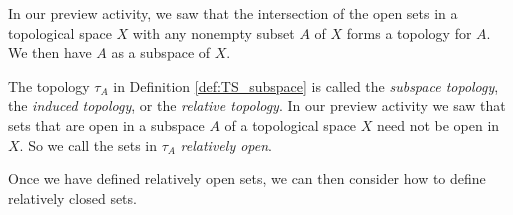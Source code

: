 \begin{comment}
	\item  Recall that the nonempty open sets in $\Z$ are those sets whose complements are finite. Note that the $\Z \setminus \{5\}$ is in $\tau_{FC}$. So if $n \in A$, then $(\Z \setminus \{5\}) \cap \{n\} = \{n\}$. So every subset of $A$ is open and $\tau_{A}$ is the discrete topology. The same argument shows that if $A$ is any finite subset of $\Z$, then the induced topology is the discrete topology. 

\item  Let $\E$ be the set of even integers. We claim that the induced topology is again the finite complement topology. Let $U$ be a subset of $\E$ with $\E \setminus U$ a finite subset of $\E$. Let $O$ be the union of $U$ with the set of odd integers. That is, $O = U \cup (\Z \setminus \E)$. Then $\Z \setminus O = \E \setminus U$ is finite and $O$ is in $\tau_{FC}$. Since $U = \E \cap O$, we have that $U$ is in the subspace topology. Conversely, if $O \in \tau_{FC}$, then $\Z \setminus O$ is finite. Since $\E \subset \Z$, we have $(\E \setminus O) \subseteq (\Z \setminus O)$ and 
\[\E \setminus (\E \cap O) = \E \setminus O\]
 is a finite set. So the only elements in the subspace topology are those whose complements in $\E$ are finite.  
 
 The same argument will show that if $X$ is an infinite topological space with the finite complement topology, then the induced topology on any infinite subset is the finite complement topology. 

\ea

\ee

\end{comment}


In our preview activity, we saw that the intersection of the open sets in a topological space $X$ with any nonempty subset $A$ of $X$ forms a topology for $A$. We then have $A$ as a subspace of $X$.  

The topology $\tau_A$ in Definition \ref{def:TS_subspace} is called the \emph{subspace topology}, the \emph{induced topology}, or the \emph{relative topology}. In our preview activity we saw that sets that are open in a subspace $A$ of a topological space $X$ need not be open in $X$. So we call the sets in $\tau_A$ \emph{relatively open}.  

Once we have defined relatively open sets, we can then consider how to define relatively closed sets. 

